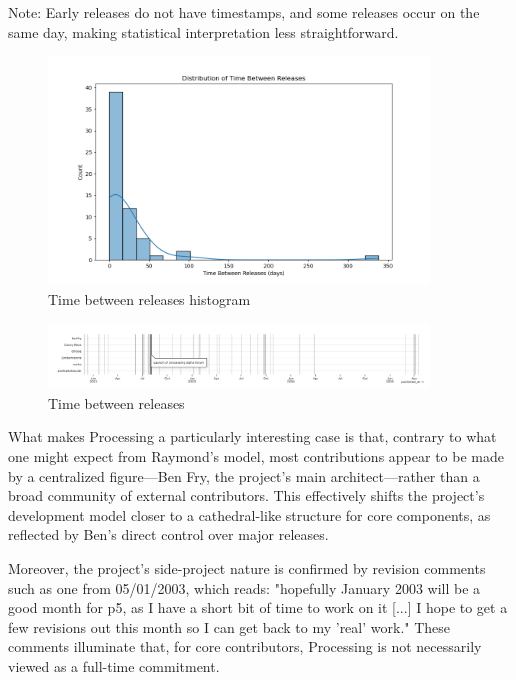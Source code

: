 \documentclass{article}
\begin{document}
Note: Early releases do not have timestamps, and some releases occur on the same day, making statistical interpretation less straightforward.

\begin{figure}[h!] 
  \centering
  \includegraphics[width=0.9\textwidth]{images/time_between_releases_histogram.png} 
  \caption{Time between releases histogram}
  \label{fig:releases_frequency_histogram}
\end{figure}

\begin{figure}[h!] 
  \centering
  \includegraphics[width=0.9\textwidth]{images/releases-lines.png} 
  \caption{Time between releases}
  \label{fig:releases-lines}
\end{figure}

What makes Processing a particularly interesting case is that, contrary to what one might expect from Raymond's model, most contributions appear to be made by a centralized figure—Ben Fry, the project's main architect—rather than a broad community of external contributors. This effectively shifts the project's development model closer to a cathedral-like structure for core components, as reflected by Ben's direct control over major releases. 

Moreover, the project’s side-project nature is confirmed by revision comments such as one from 05/01/2003, which reads: "hopefully January 2003 will be a good month for p5, as I have a short bit of time to work on it [...] I hope to get a few revisions out this month so I can get back to my 'real' work." These comments illuminate that, for core contributors, Processing is not necessarily viewed as a full-time commitment.
\end{document}
